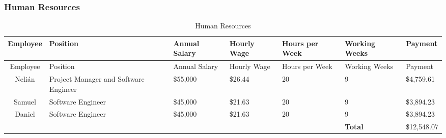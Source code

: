 \subsubsection{Human Resources}
\begin{center}
\setlength{\extrarowheight}{1.5pt}
  \begin{longtable}{|c|p{3.5cm}|p{1.5cm}|p{1cm}|p{1cm}|p{1.5cm}|p{2cm}|}
 \caption{Human Resources} \\
   \hline
  
  \centering Employee & Position & Annual Salary & Hourly Wage & Hours per Week & Working Weeks & Payment \\
  \hline \hline \endfirsthead
  
     \hline

	\centering Employee & Position & Annual Salary & Hourly Wage & Hours per Week & Working Weeks & Payment \\
	\hline \hline \endhead
  
  \endfoot  
    Nelián & Project Manager and Software Engineer & \$55,000  & \$26.44  & 20    & 9    & \$4,759.61  \\ \hline
    Samuel & Software Engineer & \$45,000  & \$21.63  & 20    & 9    & \$3,894.23  \\ \hline
    Daniel & Software Engineer & \$45,000  & \$21.63  & 20    & 9    & \$3,894.23  \\ \hline
    \multicolumn{1}{l}{}      & \multicolumn{1}{l}{}      & \multicolumn{1}{l}{}      & \multicolumn{1}{l}{}      & \multicolumn{1}{l}{}      & \multicolumn{1}{l}{\textbf{Total}} & \multicolumn{1}{l}{\$12,548.07}  \\
          
           \end{longtable}
\end{center}

